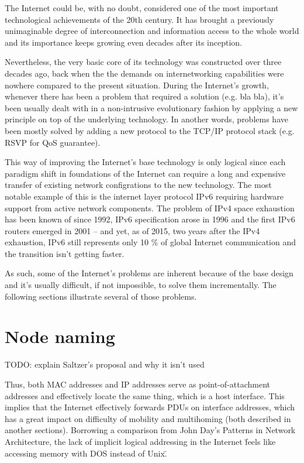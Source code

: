     The Internet could be, with no doubt, considered one of the most important technological achievements of the 20th century. It has brought a previously unimaginable degree of interconnection and information access to the whole world and its importance keeps growing even decades after its inception.

    Nevertheless, the very basic core of its technology was constructed over three decades ago, back when the the demands on internetworking capabilities were nowhere compared to the present situation. During the Internet's growth, whenever there has been a problem that required a solution (e.g. bla bla), it's been usually dealt with in a non-intrusive evolutionary fashion by applying a new principle on top of the underlying technology. In another words, problems have been mostly solved by adding a new protocol to the TCP/IP protocol stack (e.g. RSVP for QoS guarantee).

    This way of improving the Internet's base technology is only logical since each paradigm shift in foundations of the Internet can require a long and expensive transfer of existing network configrations to the new technology. The most notable example of this is the internet layer protocol IPv6 requiring hardware support from active network components. The problem of IPv4 space exhaustion has been known of since 1992, IPv6 specification arose in 1996 and the first IPv6 routers emerged in 2001 -- and yet, as of 2015, two years after the IPv4 exhaustion, IPv6 still represents only 10 \% of global Internet communication and the transition isn't getting faster.

    As such, some of the Internet's problems are inherent because of the base design and it's usually difficult, if not impossible, to solve them incrementally. The following sections illustrate several of those problems.

    \section{Node naming}

        TODO: explain Saltzer's proposal and why it isn't used

        Thus, both MAC addresses and IP addresses serve as point-of-attachment addresses and effectively locate the same thing, which is a host interface. This implies that the Internet effectively forwards PDUs on interface addresses, which has a great impact on difficulty of mobility and multihoming (both described in another sections). Borrowing a comparison from John Day's Patterns in Network Architecture, the lack of implicit logical addressing in the Internet \"feels like accessing memory with DOS instead of Unix\".

